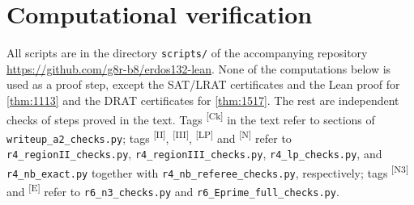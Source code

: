 \documentclass[11pt]{amsart}
\theoremstyle{definition}
\theoremstyle{remark}
\newcommand{\chk}[1]{\textsuperscript{[#1]}}
\begin{document}
\appendix
\section{Computational verification}\label{app:verification}

All scripts are in the directory \texttt{scripts/} of the accompanying repository \url{https://github.com/g8r-b8/erdos132-lean}. None of the computations below is used as a proof step, except the SAT/LRAT certificates and the Lean proof for \cref{thm:1113} and the DRAT certificates for \cref{thm:1517}. The rest are independent checks of steps proved in the text. Tags \chk{Ck} in the text refer to sections of \texttt{writeup\_a2\_checks.py}; tags \chk{II}, \chk{III}, \chk{LP} and \chk{N} refer to \texttt{r4\_regionII\_checks.py}, \texttt{r4\_regionIII\_checks.py}, \texttt{r4\_lp\_checks.py}, and \texttt{r4\_nb\_exact.py} together with \texttt{r4\_nb\_referee\_checks.py}, respectively; tags \chk{N3} and \chk{E} refer to \texttt{r6\_n3\_checks.py} and \texttt{r6\_Eprime\_full\_checks.py}.
\end{document}
